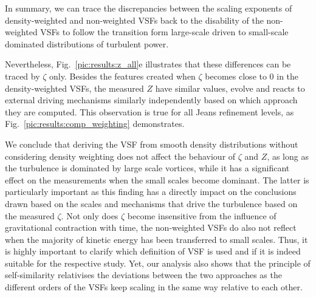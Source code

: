 In summary, we can trace the discrepancies between the scaling exponents of density-weighted and non-weighted VSFs back to the disability of the non-weighted VSFs to follow the transition form large-scale driven to small-scale dominated distributions of turbulent power.


Nevertheless, Fig.~\ref{pic:results:z_all}e illustrates that these differences can be traced by $\zeta$ only. 
Besides the features created when $\zeta$ becomes close to 0 in the density-weighted VSFs, the measured $Z$ have similar values, evolve and reacts to external driving mechanisms similarly independently based on which approach they are computed. 
This observation is true for all Jeans refinement levels, as Fig.~\ref{pic:results:comp_weighting} demonstrates.

We conclude that deriving the VSF from smooth density distributions without considering density weighting does not affect the behaviour of $\zeta$ and $Z$, as long as the turbulence is dominated by large scale vortices, while it has a significant effect on the measurements when the small scales become dominant.
The latter is particularly important as this finding has a directly impact on the conclusions drawn based on the scales and mechanisms that drive the turbulence based on the measured $\zeta$.
Not only does $\zeta$ become insensitive from the influence of gravitational contraction with time, the non-weighted VSFs do also not reflect when the majority of kinetic energy has been transferred to small scales. 
Thus, it is highly important to clarify which definition of VSF is used and if it is indeed suitable for the respective study.
Yet, our analysis also shows that the principle of self-similarity relativises the deviations between the two approaches as the different orders of the VSFs keep scaling in the same way relative to each other. 













